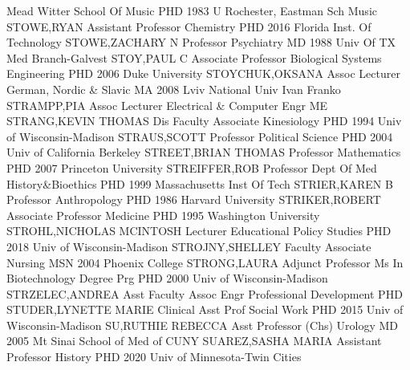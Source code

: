 \documentclass[
]{article}
\begin{document}
\textbar Mead Witter School Of Music \textbar PHD 1983 U Rochester,
Eastman Sch Music \textbar{}  \textbar STOWE,RYAN
\textbar Assistant Professor \textbar Chemistry \textbar PHD 2016
Florida Inst. Of Technology \textbar{} 
\textbar STOWE,ZACHARY N \textbar Professor \textbar Psychiatry
\textbar MD 1988 Univ Of TX Med Branch-Galvest \textbar{} 
\textbar STOY,PAUL C \textbar Associate Professor \textbar Biological
Systems Engineering \textbar PHD 2006 Duke University \textbar{}
 \textbar STOYCHUK,OKSANA \textbar Assoc Lecturer
\textbar German, Nordic \& Slavic \textbar MA 2008 Lviv National Univ
Ivan Franko \textbar{}  \textbar STRAMPP,PIA \textbar Assoc
Lecturer \textbar Electrical \& Computer Engr \textbar ME \textbar{}
 \textbar STRANG,KEVIN THOMAS \textbar Dis Faculty Associate
\textbar Kinesiology \textbar PHD 1994 Univ of Wisconsin-Madison
\textbar{}  \textbar STRAUS,SCOTT \textbar Professor
\textbar Political Science \textbar PHD 2004 Univ of California Berkeley
\textbar{}  \textbar STREET,BRIAN THOMAS \textbar Professor
\textbar Mathematics \textbar PHD 2007 Princeton University \textbar{}
 \textbar STREIFFER,ROB \textbar Professor \textbar Dept Of
Med History\&Bioethics \textbar PHD 1999 Massachusetts Inst Of Tech
\textbar{}  \textbar STRIER,KAREN B \textbar Professor
\textbar Anthropology \textbar PHD 1986 Harvard University \textbar{}
 \textbar STRIKER,ROBERT \textbar Associate Professor
\textbar Medicine \textbar PHD 1995 Washington University \textbar{}
 \textbar STROHL,NICHOLAS MCINTOSH \textbar Lecturer
\textbar Educational Policy Studies \textbar PHD 2018 Univ of
Wisconsin-Madison \textbar{}  \textbar STROJNY,SHELLEY
\textbar Faculty Associate \textbar Nursing \textbar MSN 2004 Phoenix
College \textbar{}  \textbar STRONG,LAURA \textbar Adjunct
Professor \textbar Ms In Biotechnology Degree Prg \textbar PHD 2000 Univ
of Wisconsin-Madison \textbar{}  \textbar STRZELEC,ANDREA
\textbar Asst Faculty Assoc \textbar Engr Professional Development
\textbar PHD \textbar{}  \textbar STUDER,LYNETTE MARIE
\textbar Clinical Asst Prof \textbar Social Work \textbar PHD 2015 Univ
of Wisconsin-Madison \textbar{}  \textbar SU,RUTHIE REBECCA
\textbar Asst Professor (Chs) \textbar Urology \textbar MD 2005 Mt Sinai
School of Med of CUNY \textbar{}  \textbar SUAREZ,SASHA
MARIA \textbar Assistant Professor \textbar History \textbar PHD 2020
Univ of Minnesota-Twin Cities \textbar{} 
\end{document}
